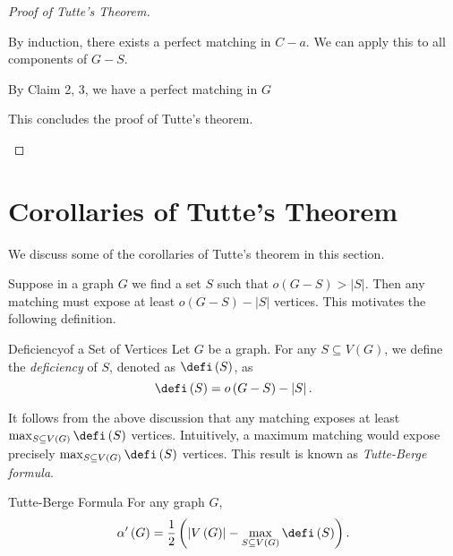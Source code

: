 \documentclass[co342]{subfiles}
\begin{document}
\begin{proof}[Proof of Tutte's Theorem]
\begin{itemize}
\begin{itemize}
\begin{itemize}
\begin{subproof}
                                    By induction, there exists a perfect matching in $C-a$. We can apply this to all components of $G-S$. 
                                \end{subproof}
                        \end{itemize}
                    By Claim 2, 3, we have a perfect matching in $G$
                \end{itemize} 
                This concludes the proof of Tutte's theorem. \qqedsym
        \end{itemize} 
    \end{proof}

    \section{Corollaries of Tutte's Theorem}

    \np We discuss some of the corollaries of Tutte's theorem in this section.

    Suppose in a graph $G$ we find a set $S$ such that $o\left( G-S \right)>\left| S \right|$. Then any matching must expose at least $o\left( G-S \right)-\left| S \right|$ vertices. This motivates the following definition.

    \begin{definition}{Deficiency}{of a Set of Vertices}
        Let $G$ be a graph. For any $S\subseteq V\left( G \right)$, we define the \emph{deficiency} of $S$, denoted as $\defi\left( S \right)$, as
        \begin{equation*}
            \defi\left( S \right) = o\left( G-S \right) - \left| S \right|.
        \end{equation*}
    \end{definition}

    \noindent It follows from the above discussion that any matching exposes at least $\max_{S\subseteq V\left( G \right)}\defi\left( S \right)$ vertices. Intuitively, a maximum matching would expose precisely $\max_{S\subseteq V\left( G \right)}\defi\left( S \right)$ vertices. This result is known as \textit{Tutte-Berge formula}.

    \begin{cor}{Tutte-Berge Formula}
        For any graph $G$,
        \begin{equation*}
            \alpha'\left( G \right) = \frac{1}{2}\left( \left| V\left( G \right) \right|-\max_{S\subseteq V\left( G \right)}\defi\left( S \right) \right).
        \end{equation*}
    \end{cor}	
\end{document}

